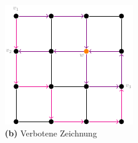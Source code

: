 \documentclass[9pt]{beamer}
\begin{document}
\begin{frame}
\begin{figure}
\begin{minipage}{0.48\textwidth}
            \includegraphics[width=\linewidth]{figures/Unerlaubt.pdf}
            \caption*{\textbf{(b)} Verbotene Zeichnung}
        \end{minipage}
    \end{figure}
\end{frame}
\end{document}
